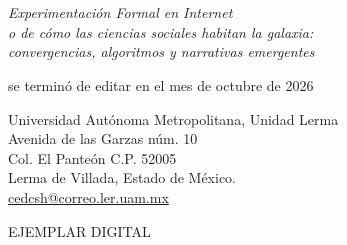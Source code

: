 \documentclass[
  spanish,
  11pt,
  a4paper,
]{scrbook}
\begin{document}
\printbibliography[heading=subbibliography, title={Referencias Bibliográficas}]


\chapter{}\label{section}

\begin{center}
\vspace*{4cm}

\textit{Experimentación Formal en Internet \\ o de cómo las ciencias sociales habitan la galaxia: \\ convergencias, algoritmos y narrativas emergentes}

\vspace{0.5cm}

se terminó de editar en el mes de octubre de 2026

\vspace{0.5cm}

Universidad Autónoma Metropolitana, Unidad Lerma \\
Avenida de las Garzas núm. 10 \\ 
Col. El Panteón C.P. 52005 \\
Lerma de Villada, Estado de México. \\

\vspace{1cm}
\href{cedcsh@correo.ler.uam.mx}{cedcsh@correo.ler.uam.mx}

\vspace{1cm}

EJEMPLAR DIGITAL

\end{center}


\backmatter
\printbibliography
\end{document}

